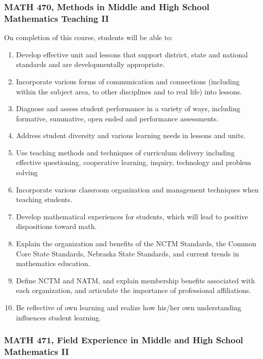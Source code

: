 \documentclass[11pt]{article}
\newenvironment{alphalist}{
  \begin{enumerate}[(1)]
    \addtolength{\itemsep}{-1.0\itemsep}}
  {\end{enumerate}}
\begin{document}
\subsubsection*{MATH 470, Methods in Middle and High School Mathematics Teaching II}

On completion of this course, students will be able to:
\begin{alphalist}
\item Develop effective unit and lessons that support district, state and national standards and are developmentally appropriate.
\item Incorporate various forms of communication and connections (including within the subject area, to other disciplines and to real life) into lessons.
\item Diagnose and assess student performance in a variety of ways, including formative, summative, open ended and performance assessments.
\item Address student diversity and various learning needs in lessons and units.
\item Use teaching methods and techniques of curriculum delivery including effective questioning, cooperative learning, inquiry, technology and problem solving
\item Incorporate various classroom organization and management techniques when teaching students.
\item Develop mathematical experiences for students, which will lead to positive dispositions toward math.
 \item Explain the organization and benefits of the NCTM Standards, the Common Core State Standards, Nebraska State Standards, and current trends in mathematics education.
\item Define NCTM and NATM, and explain membership benefits associated with each organization, and articulate the importance of professional affiliations.
\item Be reflective of own learning and realize how his/her own understanding influences student learning.
\end{alphalist}

\subsubsection*{MATH 471, Field Experience in Middle and High School Mathematics II}
\end{document}
